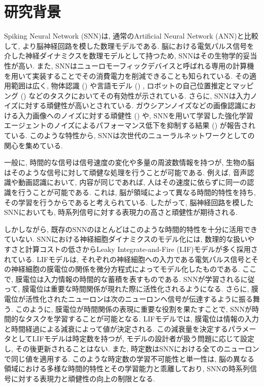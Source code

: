 \section{研究背景}
Spiking Neural Network (SNN)は, 通常のArtificial Neural Network (ANN)と比較して, より脳神経回路を模した数理モデルである.
脳における電気パルス信号を介した神経ダイナミクスを数理モデルとして持つため, SNNはその生物学的妥当性が高い.
また, SNNはニューロモーフィックデバイスと呼ばれる専用の計算機を用いて実装することでその消費電力を削減できることも知られている.
その適用範囲は広く, 物体認識 () や言語モデル () , ロボットの自己位置推定とマッピング () などのタスクにおいてその有効性が示されている\cite{yamazaki2022spiking, snnyolo, s23063037, spinnaker,snnslam}.
さらに, SNNは入力ノイズに対する頑健性が高いとされている.
ガウシアンノイズなどの画像認識における入力画像へのノイズに対する頑健性 () \cite{zhao2022spiking}や, SNNを用いて学習した強化学習エージェントのノイズによるパフォーマンス低下を抑制する結果 () が報告されている\cite{patel2019improved}.
このような特性から, SNNは次世代のニューラルネットワークとしての関心を集めている\cite{maass1997networks}.

一般に, 時間的な信号は信号速度の変化や多量の周波数情報を持つが, 生物の脳はそのような信号に対して頑健な処理を行うことが可能である.
例えば, 音声認識や動画認識において, 内容が同じであれば, 人はその速度に依らずに同一の認識を行うことが可能である.
これは, 脳が領域によって異なる時間的特性を持ち, その学習を行うからであると考えられている\cite{mattia2002population, deco2019brain}.
したがって, 脳神経回路を模したSNNにおいても, 時系列信号に対する表現力の高さと頑健性が期待される\cite{dhsnn}.

しかしながら, 既存のSNNのほとんどはこのような時間的特性を十分に活用できていない\cite{dhsnn}.
SNNにおける神経細胞ダイナミクスのモデル化には, 数理的な扱いやすさと計算コストの低さからLeaky Integrate-and-Fire (LIF)モデルが多く採用されている.
LIFモデルは, それぞれの神経細胞への入力である電気パルス信号とその神経細胞の膜電位の関係を微分方程式によってモデル化したものである.
ここで, 膜電位は入力情報の時間的な蓄積を表すものである.
SNNが学習されるに従って, 膜電位は重要な時間関係が現れた際に活性化されるようになる.
さらに, 膜電位が活性化されたニューロンは次のニューロンへ信号が伝達するように振る舞う.
このように, 膜電位が時間関係の表現に重要な役割を果たすことで, SNNが時間的なタスクを学習することが可能となる.
LIFモデルでは, 膜電位は情報の入力と時間経過による減衰によって値が決定される.
この減衰量を決定するパラメータとしてLIFモデルは時定数を持つが, モデルの設計者が扱う問題に応じて設定し, その後更新されることはない.
また, 時定数はSNNにおける全てのニューロンで同じ値を適用する.
このような時定数の学習不可能性と単一性は, 脳の異なる領域における多様な時間的特性とその学習能力と乖離しており, SNNの時系列信号に対する表現力と頑健性の向上の制限となる.


